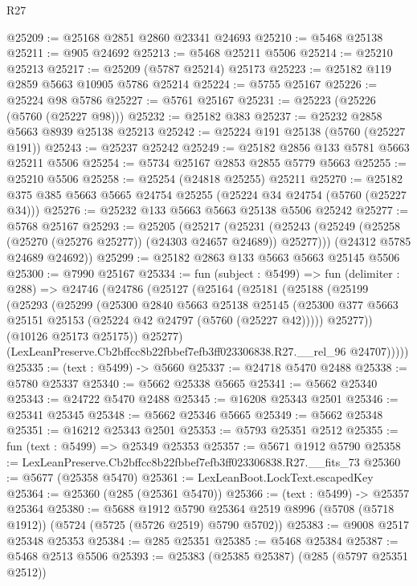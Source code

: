 \begin{lexlean}{R27}
\begin{coremodule}
@25209 := @25168 @2851 @2860 @23341 @24693
@25210 := @5468 @25138
@25211 := @905 @24692
@25213 := @5468 @25211 @5506
@25214 := @25210 @25213
@25217 := @25209 (@5787 @25214) @25173
@25223 := @25182 @119 @2859 @5663 @10905 @5786 @25214
@25224 := @5755 @25167
@25226 := @25224 @98 @5786
@25227 := @5761 @25167
@25231 := @25223 (@25226 (@5760 (@25227 @98)))
@25232 := @25182 @383
@25237 := @25232 @2858 @5663 @8939 @25138 @25213
@25242 := @25224 @191 @25138 (@5760 (@25227 @191))
@25243 := @25237 @25242
@25249 := @25182 @2856 @133 @5781 @5663 @25211 @5506
@25254 := @5734 @25167 @2853 @2855 @5779 @5663
@25255 := @25210 @5506
@25258 := @25254 (@24818 @25255) @25211
@25270 := @25182 @375 @385 @5663 @5665 @24754 @25255 (@25224 @34 @24754 (@5760 (@25227 @34)))
@25276 := @25232 @133 @5663 @5663 @25138 @5506 @25242
@25277 := @5768 @25167
@25293 := @25205
    (@25217
      (@25231 (@25243 (@25249 (@25258 (@25270 (@25276 @25277)) (@24303 @24657 @24689)) @25277)))
      (@24312 @5785 @24689 @24692))
@25299 := @25182 @2863 @133 @5663 @5663 @25145 @5506
@25300 := @7990 @25167
@25334 := fun (subject : @5499) =>
  fun (delimiter : @288) =>
  @24746
    (@24786
      (@25127
        (@25164
          (@25181
            (@25188
              (@25199
                (@25293
                  (@25299
                    (@25300
                      @2840
                      @5663
                      @25138
                      @25145
                      (@25300 @377 @5663 @25151 @25153 (@25224 @42 @24797 (@5760 (@25227 @42)))))
                    @25277))
                (@10126 @25173 @25175))
              @25277)
            (LexLeanPreserve.Cb2bffcc8b22fbbef7efb3ff023306838.R27.__rel_96 @24707)))))
@25335 := (text : @5499) -> @5660
@25337 := @24718 @5470 @2488
@25338 := @5780 @25337
@25340 := @5662 @25338 @5665
@25341 := @5662 @25340
@25343 := @24722 @5470 @2488
@25345 := @16208 @25343 @2501
@25346 := @25341 @25345
@25348 := @5662 @25346 @5665
@25349 := @5662 @25348
@25351 := @16212 @25343 @2501
@25353 := @5793 @25351 @2512
@25355 := fun (text : @5499) => @25349 @25353
@25357 := @5671 @1912 @5790
@25358 := LexLeanPreserve.Cb2bffcc8b22fbbef7efb3ff023306838.R27.__fits_73
@25360 := @5677 (@25358 @5470)
@25361 := LexLeanBoot.LockText.escapedKey
@25364 := @25360 (@285 (@25361 @5470))
@25366 := (text : @5499) -> @25357 @25364
@25380 := @5688
    @1912
    @5790
    @25364
    @2519
    @8996
    (@5708 (@5718 @1912))
    (@5724 (@5725 (@5726 @2519) @5790 @5702))
@25383 := @9008 @2517 @25348 @25353
@25384 := @285 @25351
@25385 := @5468 @25384
@25387 := @5468 @2513 @5506
@25393 := @25383 (@25385 @25387) (@285 (@5797 @25351 @2512))

\end{coremodule}
\end{lexlean}
